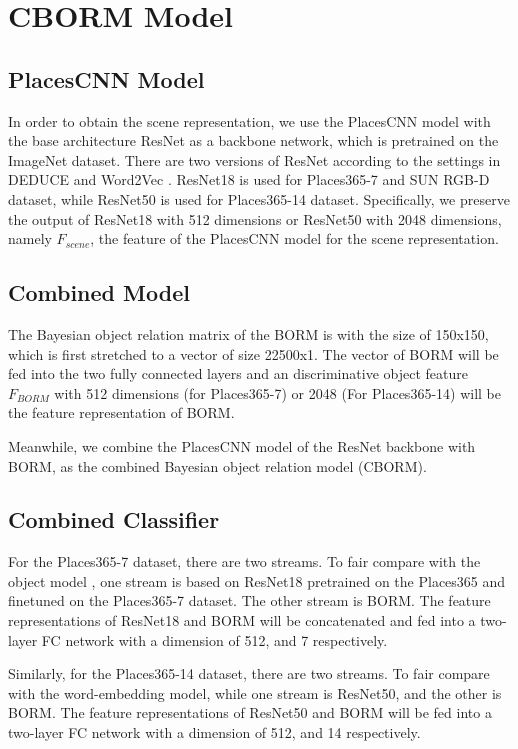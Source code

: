 \documentclass[letterpaper, 10 pt, conference]{ieeeconf}  %
\begin{document}
\section{CBORM Model}
\label{sec:cBORM}


\subsection{PlacesCNN Model}
In order to obtain the scene representation, we use the PlacesCNN model \cite{zhou2017places} with the base architecture ResNet \cite{He2016} as a backbone network, which is pretrained on the ImageNet \cite{deng2009imagenet}  dataset. There are two versions of ResNet according to the settings in DEDUCE \cite{pal2019deduce} and Word2Vec \cite{chen2019scene}. ResNet18 is used for Places365-7 and SUN RGB-D dataset, while ResNet50 is used for Places365-14 dataset. Specifically, we preserve the output of ResNet18 with 512 dimensions or ResNet50 with 2048 dimensions, namely $F_{scene}$, the feature of the PlacesCNN model for the scene representation.

\subsection{Combined Model}
The Bayesian object relation matrix of the BORM is with the size of 150x150, which is first stretched to a vector of size 22500x1. The vector of BORM will be fed into the two fully connected layers and an discriminative object feature  $F_{BORM}$ with 512 dimensions (for Places365-7) or 2048 (For Places365-14) will be the feature representation of BORM.

Meanwhile, we combine the PlacesCNN model of the ResNet backbone with BORM, as the combined Bayesian object relation model (CBORM).

\subsection{Combined Classifier}
For the Places365-7 dataset, there are two streams. To fair compare with the object model \cite{pal2019deduce}, one stream is based on ResNet18 pretrained on the Places365 and finetuned on the Places365-7 dataset. The other stream is BORM. The feature representations of ResNet18 and BORM will be concatenated and fed into a two-layer FC network with a dimension of 512, and 7 respectively. 

Similarly, for the Places365-14 dataset, there are two streams. To fair compare with the word-embedding \cite{chen2019scene} model, while one stream is ResNet50, and the other is BORM.
The feature representations of ResNet50 and BORM will be fed into a two-layer FC network with a dimension of 512, and 14 respectively.  
\end{document}
